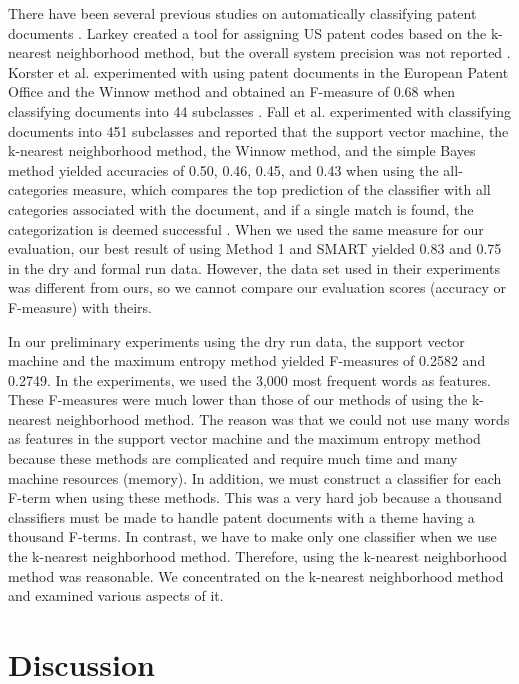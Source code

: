 \documentclass[english]{jnlp_1.2c}
\begin{document}
There have been several previous studies on automatically classifying patent documents \cite{Larkey99_2,koster-multiclassification_2,Fall03_2}.
Larkey created a tool for 
assigning US patent codes based on the k-nearest neighborhood method, 
but the overall system precision was not reported \cite{Larkey99_2}. 
Korster et al. experimented with using 
patent documents in the European Patent Office
and the Winnow method and obtained an F-measure of 0.68 
when classifying documents into 44 subclasses \cite{koster-multiclassification_2}.
Fall et al. experimented
with classifying documents into 451 subclasses 
and reported that 
the support vector machine, 
the k-nearest neighborhood method, 
the Winnow method, 
and the simple Bayes method yielded
accuracies of 0.50, 0.46, 0.45, and 0.43
when using the all-categories measure,
which compares
the top prediction of the classifier with all categories 
associated with the document, and
if a single match is found, the categorization is deemed successful \cite{Fall03_2}. 
When we used the same measure for our evaluation, 
our best result of using Method 1 and SMART
yielded 0.83 and 0.75 in the dry 
and formal run data.
However, the data set used in their experiments was different from 
ours, so we cannot compare our evaluation scores (accuracy or F-measure) 
with theirs. 

In our preliminary experiments using the dry run data, 
the support vector machine and
the maximum entropy method yielded
F-measures of 0.2582 and 0.2749.
In the experiments, 
we used the 3,000 most frequent words as features. 
These F-measures were much lower than 
those of our methods of using 
the k-nearest neighborhood method. 
The reason was that 
we could not use many words as features
in the support vector machine and
the maximum entropy method 
because these methods are complicated and 
require much time and many machine resources (memory). 
In addition, we must construct 
a classifier for each F-term when 
using these methods. 
This was a very hard job because 
a thousand classifiers must be made to
handle patent documents
with a theme having a thousand F-terms. 
In contrast, we have to 
make only one classifier
when we use the k-nearest neighborhood method. 
Therefore, using the k-nearest neighborhood method
was reasonable. 
We concentrated on the k-nearest neighborhood method 
and examined various aspects of it.

\section{Discussion}
\label{sec:discussion}
\end{document}

